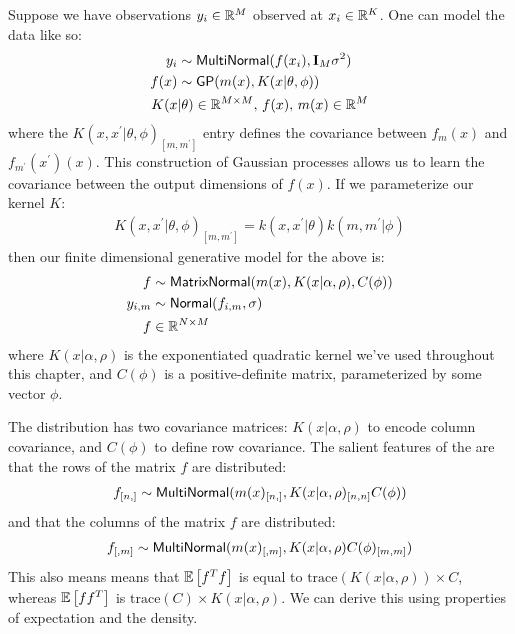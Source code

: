 Suppose we have observations $y_i \in \mathbb{R}^M$ observed at
$x_i \in \mathbb{R}^K$. One can model the data like so:
\begin{align*}
  y_i & \sim \mbox{\sf MultiNormal}(f(x_i), \mathbf{I}_M \sigma^2) \\
  f(x) & \sim \mbox{\sf GP}(m(x), K(x | \theta, \phi)) \\
  K(x & | \theta) \in \mathbb{R}^{M \times M}, \, f(x), \, m(x) \in \mathbb{R}^M
\end{align*}
where the $K(x, x^\prime | \theta, \phi)_{[m, m^\prime]}$ entry defines the
covariance between $f_m(x)$ and $f_{m^\prime}(x^\prime)(x)$. This construction
of Gaussian processes allows us to learn the covariance between the output
dimensions of $f(x)$. If we parameterize our kernel $K$:
\begin{align*} K(x, x^\prime | \theta, \phi)_{[m, m^\prime]} = k(x, x^\prime |
\theta) k(m, m^\prime | \phi) \end{align*}
then our finite dimensional generative model for the above is:
\begin{align*}
  f & \sim \mbox{\sf MatrixNormal}(m(x), K(x | \alpha, \rho), C(\phi)) \\
  y_{i, m} & \sim \mbox{\sf Normal}(f_{i,m}, \sigma) \\
  f & \in \mathbb{R}^{N \times M}
\end{align*}
where $K(x | \alpha, \rho)$ is the exponentiated quadratic kernel we've used
throughout this chapter, and $C(\phi)$ is a positive-definite matrix,
parameterized by some vector $\phi$.

The  distribution has two covariance matrices: $K(x |
\alpha, \rho)$ to encode column covariance, and $C(\phi)$ to define row
covariance. The salient features of the  are that the rows
of the matrix $f$ are distributed:
\begin{align*} f_{[n,]} \sim \mbox{\sf MultiNormal}(m(x)_{[n,]}, K(x | \alpha,
\rho)_{[n,n]} C(\phi)) \end{align*} and that the columns of the matrix $f$ are
distributed: \begin{align*} f_{[,m]} \sim \mbox{\sf MultiNormal}(m(x)_{[,m]}, K(x
  | \alpha, \rho) C(\phi)_{[m,m]}) \end{align*}
This also means means that $\mathbb{E}\left[f^T f\right]$ is equal to
$\text{trace}(K(x | \alpha, \rho)) \times C$, whereas $\mathbb{E}\left[ff^T\right]$
is $\text{trace}(C) \times K(x | \alpha, \rho)$. We can derive this using
properties of expectation and the  density.

